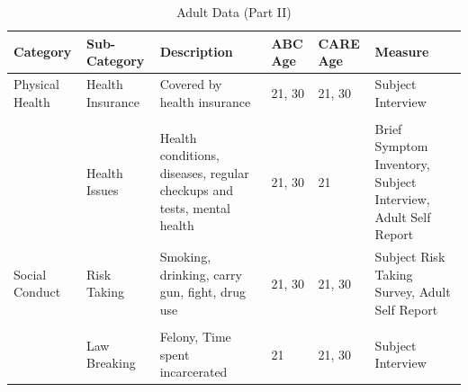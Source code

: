 \documentclass[static]{JJH-Beamer}
\begin{document}
\begin{frame}

\begin{table}[H]
\caption{Adult Data (Part II)} \label{tab:adultvars_2}
\begin{center}
\begin{tiny}
\begin{tabular}{L{1.1cm} C{1.4cm} C{2.5cm} C{.8cm} C{.8cm} C{3cm}}
\toprule
\textbf{Category}	&	\textbf{Sub-Category}	&	\textbf{Description}	&	\textbf{ABC Age}  	&  \textbf{CARE Age}  & 	\textbf{Measure}	\\ \midrule
Physical Health	&	Health Insurance	&	Covered by health insurance	&	21, 30	&	21, 30	&	Subject Interview	\\
\\											
	&	Health Issues	&	Health conditions, diseases, regular checkups and tests, mental health	&	21, 30	&	21	&	Brief Symptom Inventory, Subject Interview, Adult Self Report	\\
\midrule											
Social Conduct	&	Risk Taking	&	Smoking, drinking, carry gun, fight, drug use	&	21, 30	&	21, 30	&	Subject Risk Taking Survey, Adult Self Report	\\
\\											
	&	Law Breaking	&	Felony, Time spent incarcerated	&	21	&	21, 30	& Subject Interview	\\
 \bottomrule
\end{tabular}										
\end{tiny}
\end{center}															
\end{table}

\end{frame}
\end{document}
